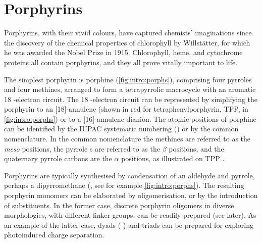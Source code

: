 \section{Porphyrins}

	Porphyrins, with their vivid colours, have captured chemists' imaginations since the discovery of the chemical properties of chlorophyll by Willst\"atter, for which he was awarded the Nobel Prize in 1915.\autocite{Willstatter1915,Robinson1953} Chlorophyll, heme, and cytochrome proteins all contain porphyrins, and they all prove vitally important to life.

	The simplest porphyrin is porphine  (\autoref{fig:intro:porphs}), comprising four pyrroles and four methines, arranged to form a tetrapyrrolic macrocycle with an aromatic 18 \pii{}-electron circuit. The 18 \pii{}-electron circuit can be represented by simplifying the porphyrin to an [18]-annulene (shown in red for tetraphenylporphyrin, TPP,  in \autoref{fig:intro:porphs}) or to a [16]-annulene dianion.\autocite{Johnson1971,Vogel1993} The atomic positions of porphine can be identified by the IUPAC systematic numbering () or by the common nomenclature. In the common nomenclature the methines are referred to as the \textit{meso} positions, the pyrrole s are referred to as the $\beta$ positions, and the quaternary pyrrole carbons are the $\alpha$ positions, as illustrated on TPP . 

	Porphyrins are typically synthesised by condensation of an aldehyde and pyrrole, perhaps  a dipyrromethane (, see for example \autoref{fig:intro:porphs}).\autocite{Littler1999b,Littler1999} The resulting porphyrin monomers can be elaborated by oligomerisation, or by the introduction of substituents. In the former case, discrete porphyrin oligomers in diverse morphologies, with different linker groups, can be readily prepared (see later).\autocite{Tanaka2015,Wang2016} As an example of the latter case, dyads ( ) and triads can be prepared for exploring photoinduced charge separation.\autocite{Guldi2002,Gilbert2015} 

